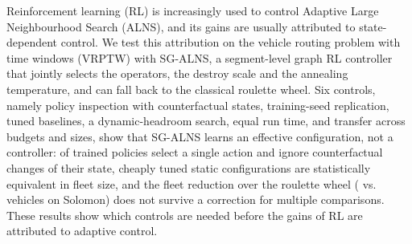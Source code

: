 Reinforcement learning (RL) is increasingly used to control Adaptive Large Neighbourhood
Search (ALNS), and its gains are usually attributed to state-dependent control. We test
this attribution on the vehicle routing problem with time windows (VRPTW) with SG-ALNS, a
segment-level graph RL controller that jointly selects the operators, the destroy scale
and the annealing temperature, and can fall back to the classical roulette wheel. Six
controls, namely policy inspection with counterfactual states, training-seed replication,
tuned baselines, a dynamic-headroom search, equal run time, and transfer across budgets
and sizes, show that SG-ALNS learns an effective configuration, not a controller:
\tCollapsed{} of \tNpol{} trained policies select a single action and ignore
counterfactual changes of their state, cheaply tuned static configurations are
statistically equivalent in fleet size, and the fleet reduction over the roulette wheel
(\rcnvSg{} vs.\ \rcnvRw{} vehicles on Solomon) does not survive a correction for multiple
comparisons. These results show which controls are needed before the gains of RL are
attributed to adaptive control.
